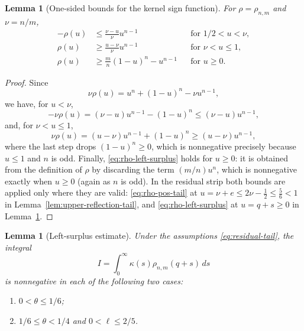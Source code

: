 \documentclass[11pt]{article}
\newtheorem{lemma}[theorem]{Lemma}
\begin{document}
\begin{lemma}[One-sided bounds for the kernel sign function]\label{lem:rho-one-sided}
For $\rho=\rho_{n,m}$ and $\nu=n/m$,
\begin{align}
        -\rho(u)&\le \frac{\nu-u}{\nu}u^{n-1}
        &&\text{for }1/2<u<\nu,\label{eq:rho-neg-tail}\\
        \rho(u)&\ge \frac{u-\nu}{\nu}u^{n-1}
        &&\text{for }\nu<u\le1,\label{eq:rho-pos-tail}\\
        \rho(u)&\ge \frac mn(1-u)^n-u^{n-1}
        &&\text{for }u\ge0.\label{eq:rho-left-surplus}
\end{align}
\end{lemma}

\begin{proof}
Since
\[
        \nu\rho(u)=u^n+(1-u)^n-\nu u^{n-1},
\]
we have, for $u<\nu$,
\[
        -\nu\rho(u)=(\nu-u)u^{n-1}-(1-u)^n\le(\nu-u)u^{n-1},
\]
and, for $\nu<u\le1$,
\[
        \nu\rho(u)=(u-\nu)u^{n-1}+(1-u)^n\ge(u-\nu)u^{n-1},
\]
where the last step drops $(1-u)^n\ge0$, which is nonnegative precisely because $u\le1$ and $n$ is odd.  Finally, \eqref{eq:rho-left-surplus} holds for $u\ge0$: it is obtained from the definition of $\rho$ by discarding the term $(m/n)u^n$, which is nonnegative exactly when $u\ge0$ (again as $n$ is odd).  In the residual strip both bounds are applied only where they are valid: \eqref{eq:rho-pos-tail} at $u=\nu+e\le2\nu-\tfrac12\le\tfrac56<1$ in Lemma~\ref{lem:upper-reflection-tail}, and \eqref{eq:rho-left-surplus} at $u=q+s\ge0$ in Lemma~\ref{lem:left-surplus-tail}.
\end{proof}

\begin{lemma}[Left-surplus estimate]\label{lem:left-surplus-tail}
Under the assumptions \eqref{eq:residual-tail}, the integral
\[
        I=\int_0^\infty \kappa(s)\rho_{n,m}(q+s)\,ds
\]
is nonnegative in each of the following two cases:
\begin{enumerate}[label=\textup{(\alph*)}]
\item $0<\theta\le1/6$;
\item $1/6\le\theta<1/4$ and $0<\ell\le2/5$.
\end{enumerate}
\end{lemma}
\end{document}
